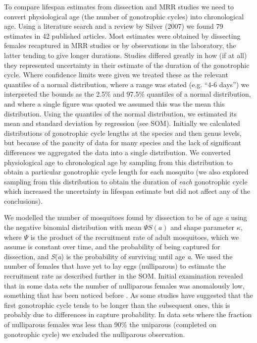 \documentclass[]{article}
\begin{document}
To compare lifespan estimates from dissection and MRR studies we need to
convert physiological age (the number of gonotrophic cycles) into
chronological age. Using a literature search and a review by Silver
(2007) we found 79 estimates in 42 published articles. Most estimates
were obtained by dissecting females recaptured in MRR studies or by
observations in the laboratory, the latter tending to give longer
durations. Studies differed greatly in how (if at all) they represented
uncertainty in their estimate of the duration of the gonotrophic cycle.
Where confidence limits were given we treated these as the relevant
quantiles of a normal distribution, where a range was stated (e.g. ``4-6
days'') we interpreted the bounds as the 2.5\% and 97.5\% quantiles of a
normal distribution, and where a single figure was quoted we assumed
this was the mean this distribution. Using the quantiles of the normal
distribution, we estimated its mean and standard deviation by regression
(see SOM). Initially we calculated distributions of gonotrophic cycle
lengths at the species and then genus levels, but because of the paucity
of data for many species and the lack of significant differences we
aggregated the data into a single distribution. We converted
physiological age to chronological age by sampling from this
distribution to obtain a particular gonotrophic cycle length for each
mosquito (we also explored sampling from this distribution to obtain the
duration of \emph{each} gonotrophic cycle which increased the
uncertainty in lifespan estimate but did not affect any of the
conclusions).

We modelled the number of mosquitoes found by dissection to be of age
\emph{a} using the negative binomial distribution with mean
$\Psi S(a)$ and shape parameter $\kappa$, where
$\Psi$ is the product of the recruitment rate of adult mosquitoes,
which we assume is constant over time, and the probability of being
captured for dissection, and \emph{S}(\emph{a}) is the probability of
surviving until age \emph{a}. We used the number of females that have
yet to lay eggs (nulliparous) to estimate the recruitment rate as
described further in the SOM. Initial examination revealed that in some
data sets the number of nulliparous females was anomalously low,
something that has been noticed before \citep{gillies1965study}. As some
studies have suggested that the first gonotrophic cycle tends to be
longer than the subsequent ones, this is probably due to differences in
capture probability. In data sets where the fraction of nulliparous
females was less than 90\% the uniparous (completed on gonotrophic
cycle) we excluded the nulliparous observation.
\end{document}
